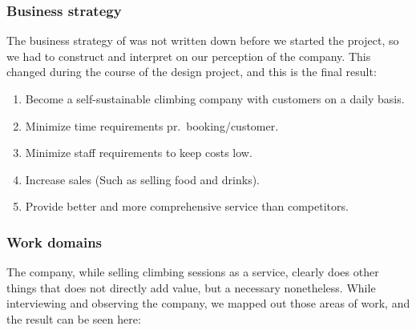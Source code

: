 \subsubsection{Business strategy}
The business strategy of \gomonkey{} was not written down before we started the
project, so we had to construct and interpret on our perception of the company.
This changed during the course of the design project, and this is the final 
result:

\begin{enumerate}
	\item Become a self-sustainable climbing company with customers on a daily basis.
	\item Minimize time requirements pr.\ booking/customer.
	\item Minimize staff requirements to keep costs low.
	\item Increase sales (Such as selling food and drinks).
	\item Provide better and more comprehensive service than competitors.
\end{enumerate}

\subsubsection{Work domains}
The company, while selling climbing sessions as a service, clearly does other
things that does not directly add value, but a necessary nonetheless.		%
While interviewing and observing the company, we mapped out those areas of 
work, and the result can be seen here:

